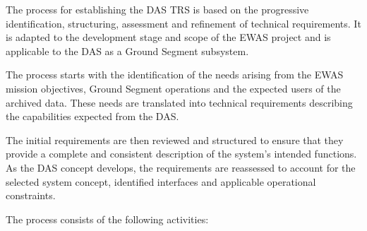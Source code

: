 The process for establishing the DAS TRS is based on the progressive identification, structuring, assessment and refinement of technical requirements. It is adapted to the development stage and scope of the EWAS project and is applicable to the DAS as a Ground Segment subsystem.

The process starts with the identification of the needs arising from the EWAS mission objectives, Ground Segment operations and the expected users of the archived data. These needs are translated into technical requirements describing the capabilities expected from the DAS.

The initial requirements are then reviewed and structured to ensure that they provide a complete and consistent description of the system's intended functions. As the DAS concept develops, the requirements are reassessed to account for the selected system concept, identified interfaces and applicable operational constraints.

The process consists of the following activities:

